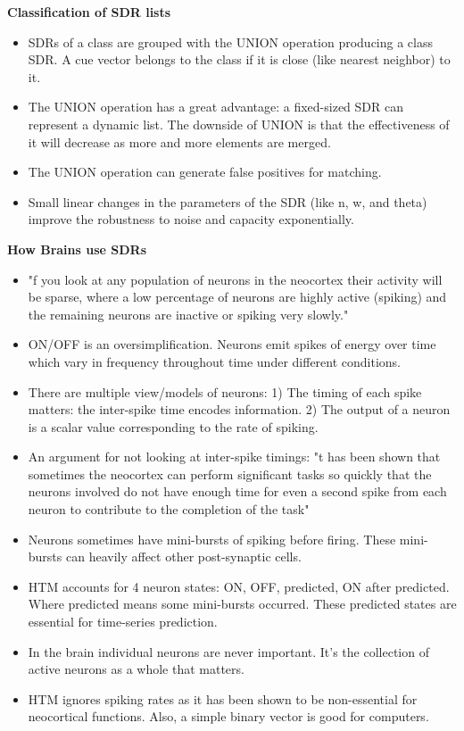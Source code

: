 \documentclass{article}
\begin{document}
\textbf{Classification of SDR lists}
\begin{itemize}
\item SDRs of a class are grouped with the UNION operation producing a class SDR. A cue vector belongs to the class if it is close (like nearest neighbor) to it.
\item The UNION operation has a great advantage: a fixed-sized SDR can represent a dynamic list. The downside of UNION is that the effectiveness of it will decrease as more and more elements are merged.
\item The UNION operation can generate false positives for matching.
\item Small linear changes in the parameters of the SDR (like n, w, and theta) improve the robustness to noise and capacity exponentially.
\end{itemize}

\textbf{How Brains use SDRs}
\begin{itemize}
\item "f you look at any population of neurons in the neocortex their activity will be sparse, where a low percentage of neurons are highly active (spiking) and the remaining neurons are inactive or spiking very slowly."
\item ON/OFF is an oversimplification. Neurons emit spikes of energy over time which vary in frequency throughout time under different conditions.
\item There are multiple view/models of neurons:
    1) The timing of each spike matters: the inter-spike time encodes information.
    2) The output of a neuron is a scalar value corresponding to the rate of spiking.
\item An argument for not looking at inter-spike timings: "t has been shown that sometimes the neocortex can perform significant tasks so quickly that the neurons involved do not have enough time for even a second spike from each neuron to contribute to the completion of the task"
\item Neurons sometimes have mini-bursts of spiking before firing. These mini-bursts can heavily affect other post-synaptic cells.
\item HTM accounts for 4 neuron states: ON, OFF, predicted, ON after predicted. Where predicted means some mini-bursts occurred. These predicted states are essential for time-series prediction.
\item In the brain individual neurons are never important. It's the collection of active neurons as a whole that matters.
\item HTM ignores spiking rates as it has been shown to be non-essential for neocortical functions. Also, a simple binary vector is good for computers.
\end{itemize}
\end{document}
